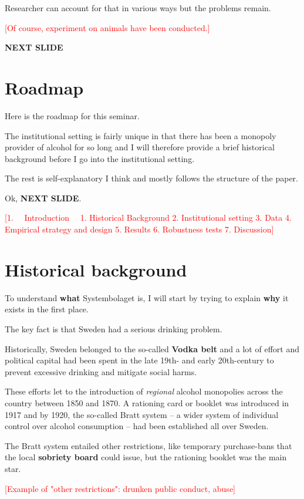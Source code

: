 \documentclass[12pt]{article}
\newcommand{\TODO}[1]{\textcolor{red}{[#1]}}
\begin{document}
Researcher can account for that in various ways but the problems remain.


\TODO{Of course, experiment on animals have been conducted.}

\textbf{NEXT SLIDE}
\section{Roadmap}

Here is the roadmap for this seminar.

The institutional setting is fairly unique in that there has been a monopoly provider of alcohol for so long and I will therefore provide a brief historical background before I go into the institutional setting. 

The rest is self-explanatory I think and mostly follows the structure of the paper.

Ok, \textbf{NEXT SLIDE}.

\TODO{1. ~~Introduction~~
1.  Historical Background 
2.  Institutional setting
3.  Data
4.  Empirical strategy and design
5.  Results
6.  Robustness tests
7.  Discussion}



\section{Historical background}

To understand  \textbf{what}  Systembolaget is, I will start by trying to explain  \textbf{why}  it exists in the first place. 

The key fact is that Sweden had a serious drinking problem. 

Historically, Sweden belonged to the so-called \textbf{Vodka belt} and a lot of effort and political capital had been spent in the late 19th- and early 20th-century to prevent excessive drinking and mitigate social harms.

These efforts let to the introduction of \emph{regional}  alcohol monopolies across the country between 1850 and 1870. A rationing card or booklet was introduced in 1917 and by 1920, the so-called Bratt system -- a wider system of individual control over alcohol consumption -- had been established all over Sweden. 

The Bratt system entailed other restrictions, like temporary purchase-bans that the local  \textbf{sobriety board}  could issue, but the rationing booklet was the main star.

\TODO{Example of "other restrictions": drunken public conduct, abuse}
\end{document}
